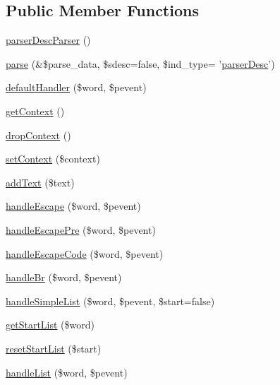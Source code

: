 \subsection*{\-Public \-Member \-Functions}
\begin{DoxyCompactItemize}
\item 
\hyperlink{classparser_desc_parser_a6b5a7684a82c049dace710f5f362d1f7}{parser\-Desc\-Parser} ()
\item 
\hyperlink{classparser_desc_parser_a8809babbf272c78d3878052fab7d20ed}{parse} (\&\$parse\-\_\-data, \$sdesc=false, \$ind\-\_\-type= '\hyperlink{classparser_desc}{parser\-Desc}')
\item 
\hyperlink{classparser_desc_parser_a4d5d6de1bd28d678fdca6e4d5e0076b0}{default\-Handler} (\$word, \$pevent)
\item 
\hyperlink{classparser_desc_parser_a51609a8c7faaf9948679e3a291ba4733}{get\-Context} ()
\item 
\hyperlink{classparser_desc_parser_ac93ef2f1ddad45bbaf0d7c25221f5d20}{drop\-Context} ()
\item 
\hyperlink{classparser_desc_parser_a313783d5477383dd99a2f3785705aaf4}{set\-Context} (\$context)
\item 
\hyperlink{classparser_desc_parser_acb246776bf97e23ed8ccf1349453bc9b}{add\-Text} (\$text)
\item 
\hyperlink{classparser_desc_parser_a1c2833854f29529aca0a7deb1aad9b40}{handle\-Escape} (\$word, \$pevent)
\item 
\hyperlink{classparser_desc_parser_a48b3565b84588d35119404d38f16a202}{handle\-Escape\-Pre} (\$word, \$pevent)
\item 
\hyperlink{classparser_desc_parser_a6f4538b760d41426ab3019deb43775e9}{handle\-Escape\-Code} (\$word, \$pevent)
\item 
\hyperlink{classparser_desc_parser_a4110067aef8352472024a37bf5e962bc}{handle\-Br} (\$word, \$pevent)
\item 
\hyperlink{classparser_desc_parser_abdf6cd893ab56e30152125c9cca855b1}{handle\-Simple\-List} (\$word, \$pevent, \$start=false)
\item 
\hyperlink{classparser_desc_parser_a1350f1224d3ea17fe46e983de419cad2}{get\-Start\-List} (\$word)
\item 
\hyperlink{classparser_desc_parser_ad15b34a253a15792b19c7606fb51bdc5}{reset\-Start\-List} (\$start)
\item 
\hyperlink{classparser_desc_parser_a65652132e5397debc49124158e1dd1c2}{handle\-List} (\$word, \$pevent)
\item 

\end{DoxyCompactItemize}

